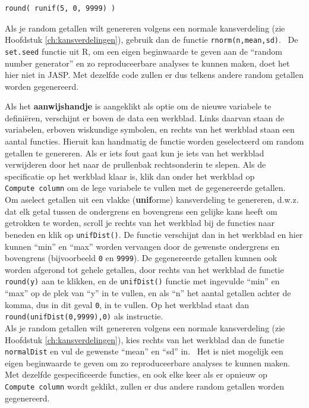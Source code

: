 \documentclass[
]{book}
\begin{document}
\begin{verbatim}
round( runif(5, 0, 9999) )
\end{verbatim}

Als je random getallen wilt genereren volgens een normale kansverdeling (zie Hoofdstuk \ref{ch:kansverdelingen}), gebruik dan de functie \texttt{rnorm(n,mean,sd)}.~
De \texttt{set.seed} functie uit R, om een eigen beginwaarde te geven aan de ``random number generator'' en zo reproduceerbare analyses te kunnen maken, doet het hier niet in JASP. Met dezelfde code zullen er dus telkens andere random getallen worden gegenereerd.

Als het \textbf{aanwijshandje} is aangeklikt als optie om de nieuwe variabele te definiëren, verschijnt er boven de data een werkblad. Links daarvan staan de variabelen, erboven wiskundige symbolen, en rechts van het werkblad staan een aantal functies. Hieruit kan handmatig de functie worden geselecteerd om random getallen te genereren. Als er iets fout gaat kun je iets van het werkblad verwijderen door het naar de prullenbak rechtsonderin te slepen. Als de specificatie op het werkblad klaar is, klik dan onder het werkblad op \texttt{Compute\ column} om de lege variabele te vullen met de gegenereerde getallen.\\
Om aselect getallen uit een vlakke (\textbf{unif}orme) kansverdeling te genereren, d.w.z. dat elk getal tussen de ondergrens en bovengrens een gelijke kans heeft om getrokken te worden, scroll je rechts van het werkblad bij de functies naar beneden en klik op \texttt{unifDist()}. De functie verschijnt dan in het werkblad en hier kunnen ``min'' en ``max'' worden vervangen door de gewenste ondergrens en bovengrens (bijvoorbeeld \texttt{0} en \texttt{9999}). De gegenereerde getallen kunnen ook worden afgerond tot gehele getallen, door rechts van het werkblad de functie \texttt{round(y)} aan te klikken, en de \texttt{unifDist()} functie met ingevulde ``min'' en ``max'' op de plek van ``y'' in te vullen, en als ``n'' het aantal getallen achter de komma, dus in dit geval \texttt{0}, in te vullen. Op het werkblad staat dan \texttt{round(unifDist(0,9999),0)} als instructie.\\
Als je random getallen wilt genereren volgens een normale kansverdeling (zie Hoofdstuk \ref{ch:kansverdelingen}), kies rechts van het werkblad dan de functie \texttt{normalDist} en vul de gewenste ``mean'' en ``sd'' in.~
Het is niet mogelijk een eigen beginwaarde te geven om zo reproduceerbare analyses te kunnen maken. Met dezelfde gespecificeerde functies, en ook elke keer als er opnieuw op \texttt{Compute\ column} wordt geklikt, zullen er dus andere random getallen worden gegenereerd.
\end{document}
